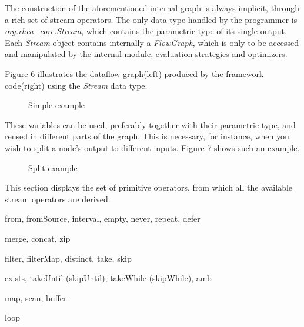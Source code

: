 \documentclass{dithesis}
\begin{document}

The construction of the aforementioned internal graph is always implicit, through a rich set of stream operators. The only data type handled by the programmer is \textit{org.rhea\_core.Stream}, which contains the parametric type of its single output. Each \textit{Stream} object contains internally a \textit{FlowGraph}, which is only to be accessed and manipulated by the internal module, evaluation strategies and optimizers.

Figure 6 illustrates the dataflow graph(left) produced by the framework code(right) using the \textit{Stream} data type.

\begin{figure}[h!] 
	\begin{multicols}{2}
	\resizebox{0.5\textwidth}{!}{
			
	}
	\end{multicols}
	\caption{Simple example}
\end{figure}

These variables can be used, preferably together with their parametric type, and reused in different parts of the graph. This is necessary, for instance, when you wish to split a node's output to different inputs. Figure 7 shows such an example.

\begin{figure}[h!] 
	\begin{multicols}{2}
	\resizebox{0.5\textwidth}{!}{
			
	}
	\end{multicols}
	\caption{Split example}
\end{figure}

This section displays the set of primitive operators, from which all the available stream operators are derived. 

from, fromSource, interval, empty, never, repeat, defer

merge, concat, zip

filter, filterMap, distinct, take, skip

exists, takeUntil (skipUntil), takeWhile (skipWhile), amb 

map, scan, buffer

loop
\end{document}
